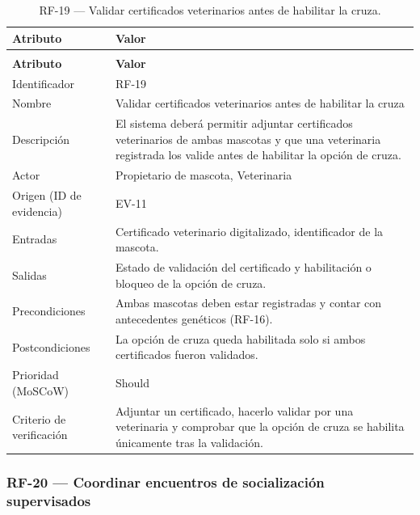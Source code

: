 \documentclass[journal,onecolumn]{IEEEtran}
\makeatletter
\newenvironment{atributos}[2]{%
	\small
	\begin{longtable}{@{}>{\raggedright\arraybackslash}p{4.2cm} >{\raggedright\arraybackslash}p{11.2cm}@{}}
		\caption{#2}\label{tab:#1}\\
		\toprule
		\textbf{Atributo} & \textbf{Valor} \\
		\midrule
		\endfirsthead
		\multicolumn{2}{@{}l}{\small\itshape (continuación)}\\
		\toprule
		\textbf{Atributo} & \textbf{Valor} \\
		\midrule
		\endhead
		\bottomrule
		\endlastfoot
	}{%
	\end{longtable}
	\normalsize
}
\makeatother
\begin{document}
	\begin{atributos}{RF-19}{RF-19 --- Validar certificados veterinarios antes de habilitar la cruza.}
		Identificador & RF-19 \\
		Nombre & Validar certificados veterinarios antes de habilitar la cruza \\
		Descripción & El sistema deberá permitir adjuntar certificados veterinarios de ambas mascotas y que una veterinaria registrada los valide antes de habilitar la opción de cruza. \\
		Actor & Propietario de mascota, Veterinaria \\
		Origen (ID de evidencia) & EV-11 \\
		Entradas & Certificado veterinario digitalizado, identificador de la mascota. \\
		Salidas & Estado de validación del certificado y habilitación o bloqueo de la opción de cruza. \\
		Precondiciones & Ambas mascotas deben estar registradas y contar con antecedentes genéticos (RF-16). \\
		Postcondiciones & La opción de cruza queda habilitada solo si ambos certificados fueron validados. \\
		Prioridad (MoSCoW) & Should \\
		Criterio de verificación & Adjuntar un certificado, hacerlo validar por una veterinaria y comprobar que la opción de cruza se habilita únicamente tras la validación. \\
	\end{atributos}
	
	\subsubsection{RF-20 --- Coordinar encuentros de socialización supervisados}
	
\end{document}
